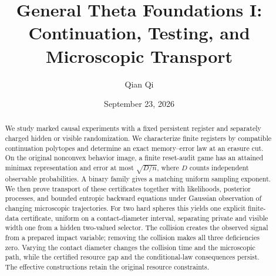 
\usepackage{tikz}
\usetikzlibrary{arrows.meta,positioning}
\newcommand{\Wone}{W_1}
\newcommand{\Del}{\Delta}
\newcommand{\emptyw}{\varnothing}
\newcommand{\osc}{\operatorname{osc}}
\newcommand{\diam}{\operatorname{diam}}
\newcommand{\Lipone}{\operatorname{Lip}_1}
\newcommand{\aff}{\operatorname{aff}}
\newcommand{\conv}{\operatorname{conv}}
\newcommand{\rplus}{\operatorname{rank}_{+}}
\newcommand{\dpr}{\delta^{\rm p}}
\newcommand{\dhi}{\delta^{\rm h}}
\newcommand{\dvi}{\delta^{\rm v}}
\newcommand{\dmix}{\delta^{\rm mix}}
\newcommand{\cK}{\mathcal K}
\newcommand{\cB}{\mathcal B}
\newcommand{\cI}{\mathcal I}
\newcommand{\KL}{\operatorname{KL}}
\newcommand{\vaudit}{v^{\rm aud}}
\title[General Theta Foundations I]{General Theta Foundations I:\\Continuation, Testing, and Microscopic Transport}
\author{Qian Qi}
\date{September 23, 2026}

\begin{abstract}
We study marked causal experiments with a fixed persistent register and
separately charged hidden or visible randomization. We characterize finite
registers by compatible continuation polytopes and determine an exact
memory--error law at an erasure cut. On the original nonconvex behavior image,
a finite reset-audit game has an attained minimax representation and error
at most $\sqrt{D/n}$, where $D$ counts independent observable probabilities.
A binary family gives a matching uniform sampling exponent. We then prove
transport of these certificates together with likelihoods, posterior
processes, and bounded entropic backward equations under Gaussian observation
of changing microscopic trajectories. For two hard spheres this yields one
explicit finite-data certificate, uniform on a contact-diameter interval,
separating private and visible width one from a hidden two-valued selector.
The collision creates the observed signal from a prepared impact variable;
removing the collision makes all three deficiencies zero. Varying the
contact diameter changes the collision time and the microscopic path, while
the certified resource gap and the conditional-law consequences persist.
The effective constructions retain the original resource constraints.
\end{abstract}
\maketitle
\tableofcontents
